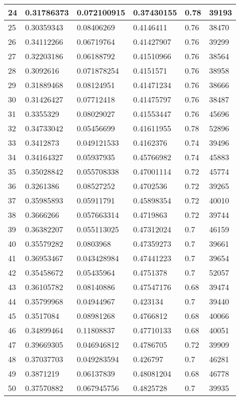 \begin{longtable}{|l|l|l|l|l|l|}
24 & 0.31786373 & 0.072100915 & 0.37430155 & 0.78 & 39193 \\ \hline 
25 & 0.30359343 & 0.08406269 & 0.4146411 & 0.76 & 38470 \\ \hline 
26 & 0.34112266 & 0.06719764 & 0.41427907 & 0.76 & 39299 \\ \hline 
27 & 0.32203186 & 0.06188792 & 0.41510966 & 0.76 & 38564 \\ \hline 
28 & 0.3092616 & 0.071878254 & 0.4151571 & 0.76 & 38958 \\ \hline 
29 & 0.31889468 & 0.08124951 & 0.41471234 & 0.76 & 38666 \\ \hline 
30 & 0.31426427 & 0.07712418 & 0.41475797 & 0.76 & 38487 \\ \hline 
31 & 0.3355329 & 0.08029027 & 0.41553447 & 0.76 & 45696 \\ \hline 
32 & 0.34733042 & 0.05456699 & 0.41611955 & 0.78 & 52896 \\ \hline 
33 & 0.3412873 & 0.049121533 & 0.4162376 & 0.74 & 39496 \\ \hline 
34 & 0.34164327 & 0.05937935 & 0.45766982 & 0.74 & 45883 \\ \hline 
35 & 0.35028842 & 0.055708338 & 0.47001114 & 0.72 & 45774 \\ \hline 
36 & 0.3261386 & 0.08527252 & 0.4702536 & 0.72 & 39265 \\ \hline 
37 & 0.35985893 & 0.05911791 & 0.45898354 & 0.72 & 40010 \\ \hline 
38 & 0.3666266 & 0.057663314 & 0.4719863 & 0.72 & 39744 \\ \hline 
39 & 0.36382207 & 0.055113025 & 0.47312024 & 0.7 & 46159 \\ \hline 
40 & 0.35579282 & 0.0803968 & 0.47359273 & 0.7 & 39661 \\ \hline 
41 & 0.36953467 & 0.043428984 & 0.47441223 & 0.7 & 39654 \\ \hline 
42 & 0.35458672 & 0.05435964 & 0.4751378 & 0.7 & 52057 \\ \hline 
43 & 0.36105782 & 0.08140886 & 0.47547176 & 0.68 & 39474 \\ \hline 
44 & 0.35799968 & 0.04944967 & 0.423134 & 0.7 & 39440 \\ \hline 
45 & 0.3517084 & 0.08981268 & 0.4766812 & 0.68 & 40066 \\ \hline 
46 & 0.34899464 & 0.11808837 & 0.47710133 & 0.68 & 40051 \\ \hline 
47 & 0.39669305 & 0.046946812 & 0.4786705 & 0.72 & 39909 \\ \hline 
48 & 0.37037703 & 0.049283594 & 0.426797 & 0.7 & 46281 \\ \hline 
49 & 0.3871219 & 0.06137839 & 0.48081204 & 0.68 & 46778 \\ \hline 
50 & 0.37570882 & 0.067945756 & 0.4825728 & 0.7 & 39935 \\ \hline 
\end{longtable}